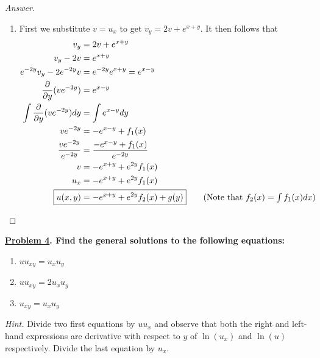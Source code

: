 \documentclass{article}
\theoremstyle{definition}
\renewcommand\qedsymbol{$\blacksquare$}
\newenvironment{ans}{\begin{proof}[Answer]\renewcommand{\qedsymbol}{}}{\end{proof}}
\newenvironment{boldenv}{\bfseries\boldmath}{}
\begin{document}
\begin{ans}
\begin{enumerate}[resume*=answers]
			\item First we substitute $v = u_x$ to get $v_y = 2v + e^{x+y}$. It then follows that
			\begin{align*}
				v_y &= 2v + e^{x+y}\\
				v_y - 2v &= e^{x+y}\\
				e^{-2y}v_y - 2e^{-2y}v &= e^{-2y}e^{x+y} = e^{x-y}\\
				\frac{\partial}{\partial y}(ve^{-2y}) &= e^{x-y}\\
				\int \frac{\partial}{\partial y}(ve^{-2y})dy &= \int e^{x-y}dy\\
				ve^{-2y} &= -e^{x-y} + f_1(x)\\
				\frac{ve^{-2y}}{e^{-2y}} &= \frac{-e^{x-y} + f_1(x)}{e^{-2y}}\\
				v &= -e^{x+y} + e^{2y}f_1(x)\\
				u_x &= -e^{x+y} + e^{2y}f_1(x)\\
				\Aboxed{u(x,y) &= -e^{x+y} + e^{2y}f_2(x) + g(y)} \tag{Note that $f_2(x) = \int f_1(x)dx$}
			\end{align*}
		\end{enumerate}
	\end{ans}
	
	\begin{boldenv}
		\underline{Problem 4}. Find the general solutions to the following equations:
		\begin{enumerate}[resume*=problems]
			\item $uu_{xy} = u_xu_y$
			\item $uu_{xy} = 2u_xu_y$
			\item $u_{xy} = u_xu_y$
		\end{enumerate}
		\textit{Hint.} Divide two first equations by $uu_x$ and observe that both the right and left-hand expressions are derivative with respect to $y$ of $\ln(u_x)$ and $\ln(u)$ respectively. Divide the last equation by $u_x$.
	\end{boldenv}
	
\end{document}
